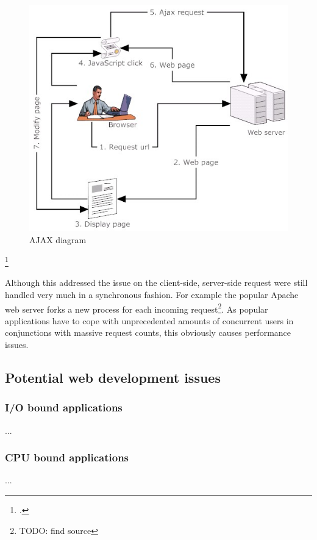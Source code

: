 \begin{figure}[hbtp]
\centering
\includegraphics[scale=0.5]{img/ajax-diagram}
\caption[AJAX Ddiagram]{AJAX diagram\footnotemark\label{img_ajax}}
\end{figure}
\footcitetext{img_ajax}

Although this addressed the issue on the client-side, server-side request were
still handled very much in a synchronous fashion. For example the popular Apache
web server forks a new process for each incoming request\footnote{TODO: find
source}. As popular applications have to cope with unprecedented amounts of
concurrent users in conjunctions with massive request counts, this obviously
causes performance issues.\\



\subsection{Potential web development issues}
\label{potentialissues}

\subsubsection{I/O bound applications}
\label{issue_io}
...
\subsubsection{CPU bound applications}
\label{issue_cpu}
...
